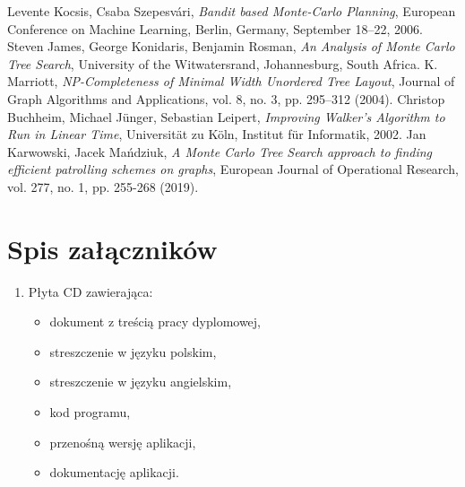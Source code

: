 \documentclass[a4paper,11pt,twoside]{report}
\theoremstyle{definition}
\begin{document}
\begin{thebibliography}{20}%
 Levente Kocsis, Csaba Szepesvári, \emph{Bandit based Monte-Carlo Planning}, European Conference on Machine Learning, Berlin, Germany, September 18--22, 2006.
 Steven James, George Konidaris, Benjamin Rosman, \emph{An Analysis of Monte Carlo Tree Search}, University of the Witwatersrand, Johannesburg, South Africa.
 K. Marriott, \emph{NP-Completeness of Minimal Width Unordered Tree Layout}, Journal of Graph Algorithms and Applications, vol. 8, no. 3, pp. 295--312 (2004).
 Christop Buchheim, Michael Jünger, Sebastian Leipert, \emph{Improving Walker's Algorithm to Run in Linear Time}, Universität zu Köln, Institut für Informatik, 2002.
 Jan Karwowski, Jacek Mańdziuk, \emph{A Monte Carlo Tree Search approach to finding efficient patrolling schemes on graphs}, European Journal of Operational Research, vol. 277, no. 1, pp. 255-268 (2019).
\end{thebibliography}

\thispagestyle{empty}

\listoffigures
\thispagestyle{empty}


\renewcommand{\listtablename}{Spis tabel}
\listoftables
\thispagestyle{empty}



\chapter*{Spis załączników}
\begin{enumerate}
\item Płyta CD zawierająca:
\begin{itemize}
	\item dokument z treścią pracy dyplomowej,
	\item streszczenie w języku polskim,
	\item streszczenie w języku angielskim,
	\item kod programu,
	\item przenośną wersję aplikacji,
	\item dokumentację aplikacji.
\end{itemize}
\end{enumerate}
\thispagestyle{empty}
\end{document}

